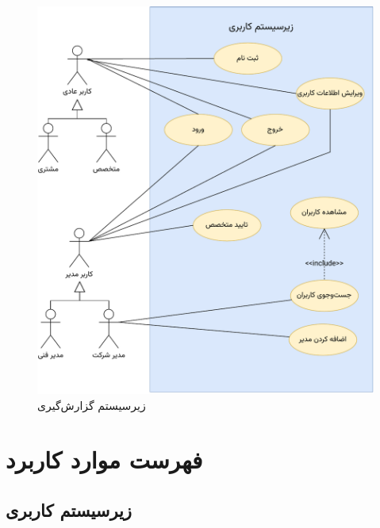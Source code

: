 \begin{figure}
\centering
	\includegraphics[scale=0.9, page=4]{figs/usecase.pdf}
\caption{زیرسیستم گزارش‌گیری}
\end{figure}
\FloatBarrier
\newpage

\newpage
\section{فهرست موارد کاربرد}


\subsection{زیرسیستم کاربری}
\renewcommand{\labelenumiii}{\arabic{enumi}.\arabic{enumii}.\arabic{enumiii}}

